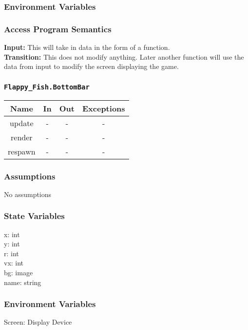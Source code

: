 \documentclass[11pt, oneside]{article}   	%
\begin{document}
\subsubsection*{Environment Variables}


\subsubsection*{Access Program Semantics} 
 \textbf{Input:} This will take in data in the form of a function. \\
 \textbf{Transition:} This does not modify anything. Later another function will use the data from input to modify the screen displaying the game.



\subsubsection*{\texttt{Flappy\_Fish.BottomBar}}



\begin{center}
\begin{tabular}{ |c|c|c|c| } 
 \hline
 Name & In & Out & Exceptions \\ 
 \hline \hline
 update & - & - & - \\ 
render & - & - & - \\ 
respawn & - & - & - \\ 
 \hline
\end{tabular}
\end{center}

\subsubsection*{Assumptions}
No assumptions

\subsubsection*{State Variables}
x: int\\
y: int\\
r: int\\
vx: int \\
bg: image \\
name: string\\
\subsubsection*{Environment Variables}
Screen: Display Device
\end{document}

